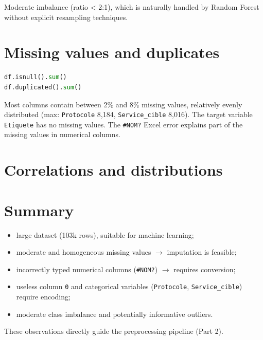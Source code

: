 Moderate imbalance (ratio < 2:1), which is naturally handled by Random Forest without explicit resampling techniques.


\section{Missing values and duplicates}

\begin{lstlisting}[language=Python]
df.isnull().sum()
df.duplicated().sum()
\end{lstlisting}

Most columns contain between 2\% and 8\% missing values, relatively evenly distributed (max: \texttt{Protocole} 8,184, \texttt{Service\_cible} 8,016). The target variable \texttt{Etiquete} has no missing values. The \texttt{\#NOM?} Excel error explains part of the missing values in numerical columns.


\section{Correlations and distributions}

\section{Summary}

\begin{itemize}[leftmargin=*,itemsep=2pt]
    \item large dataset (103k rows), suitable for machine learning;
    \item moderate and homogeneous missing values $\rightarrow$ imputation is feasible;
    \item incorrectly typed numerical columns (\texttt{\#NOM?}) $\rightarrow$ requires conversion;
    \item useless column \texttt{0} and categorical variables (\texttt{Protocole}, \texttt{Service\_cible}) require encoding;
    \item moderate class imbalance and potentially informative outliers.
\end{itemize}

These observations directly guide the preprocessing pipeline (Part 2).
